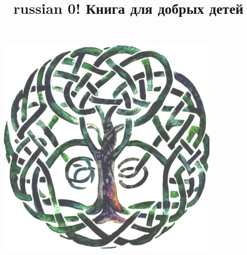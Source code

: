 \documentclass[14pt]{memoir}
\title{\begin{otherlanguage*}{russian}
0! Книга для добрых детей
\end{otherlanguage*}}
\author{}
\begin{document}
\date{} %
\maketitle
\begin{center}
\includegraphics[height=11cm]{images/tree-cover} 
\end{center}
\thispagestyle{empty}
\newpage
\thispagestyle{empty}  %


\clearpage
\hfill
\end{document}
